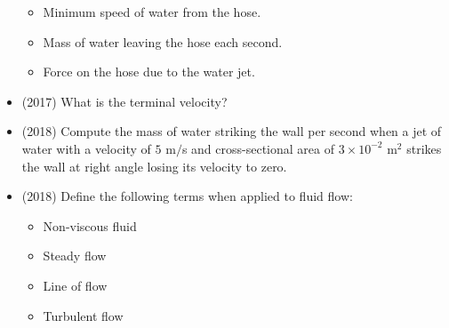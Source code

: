 \documentclass{article}
\begin{document}
\begin{itemize}
 \begin{itemize}
\item Minimum speed of water from the hose.
\item Mass of water leaving the hose each second.
\item Force on the hose due to the water jet.
\end{itemize}
\item (2017)  What is the terminal velocity?
\item (2018)  Compute the mass of water striking the wall per second when a jet of water with a velocity of $ 5$ m$/$s and cross-sectional area of $ 3 \times 10^{-2}$ m$ ^{2}$ strikes the wall at right angle losing its velocity to zero. 
\item (2018)  Define the following terms when applied to fluid flow:
 \begin{itemize}
\item Non-viscous fluid 
\item Steady flow 
\item Line of flow 
\item Turbulent flow
\end{itemize}
\end{itemize}
\end{document}
